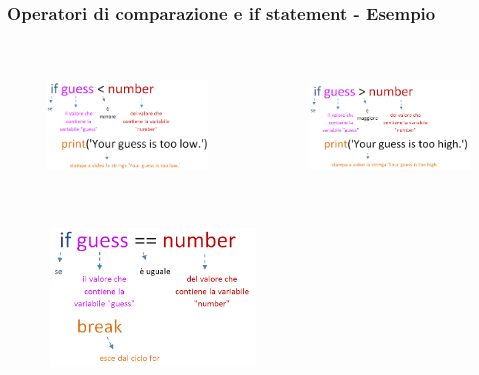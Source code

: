 \documentclass{beamer}
\begin{document}
\begin{frame}[fragile]
\frametitle{Operatori di comparazione e if statement - Esempio}
		\begin{columns}[T]
			\begin{column}[T]{0.5\textwidth}
				\begin{figure}[t]
					\includegraphics[height=3.7cm, width=\textwidth]{images/if.png}
				\end{figure}
			\end{column}
			\begin{column}[T]{0.5\textwidth}
				\begin{figure}[t]
					\includegraphics[height=3.7cm, width=\textwidth]{images/if2.png}
				\end{figure}
			\end{column}
		\end{columns}
	\begin{figure}
		\includegraphics[height=3.7cm, width=0.5\textwidth]{images/if3.png}
	\end{figure}
\end{frame}
\end{document}
